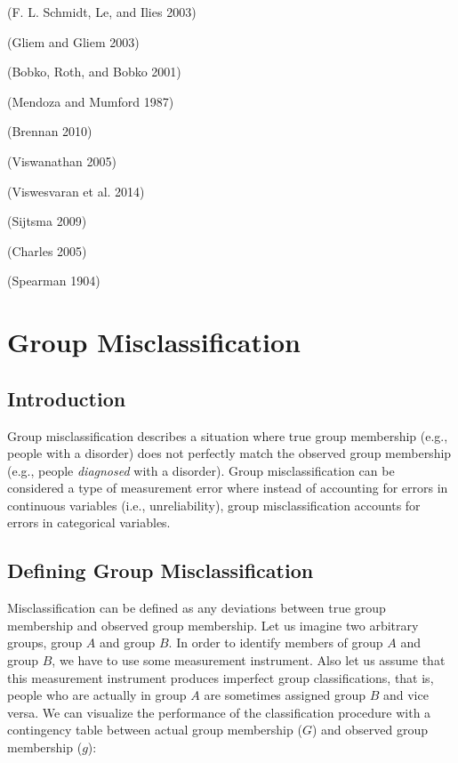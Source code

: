 \documentclass[
  letterpaper,
  DIV=11,
  numbers=noendperiod]{scrreprt}
\begin{document}
(F. L. Schmidt, Le, and Ilies 2003)

(Gliem and Gliem 2003)

(Bobko, Roth, and Bobko 2001)

(Mendoza and Mumford 1987)

(Brennan 2010)

(Viswanathan 2005)

(Viswesvaran et al. 2014)

(Sijtsma 2009)

(Charles 2005)

(Spearman 1904)

\hypertarget{group-misclassification}{%
\chapter{Group Misclassification}\label{group-misclassification}}

\hypertarget{introduction-2}{%
\section{Introduction}\label{introduction-2}}

Group misclassification describes a situation where true group
membership (e.g., people with a disorder) does not perfectly match the
observed group membership (e.g., people \emph{diagnosed} with a
disorder). Group misclassification can be considered a type of
measurement error where instead of accounting for errors in continuous
variables (i.e., unreliability), group misclassification accounts for
errors in categorical variables.

\hypertarget{defining-group-misclassification}{%
\section{Defining Group
Misclassification}\label{defining-group-misclassification}}

Misclassification can be defined as any deviations between true group
membership and observed group membership. Let us imagine two arbitrary
groups, group \(A\) and group \(B\). In order to identify members of
group \(A\) and group \(B\), we have to use some measurement instrument.
Also let us assume that this measurement instrument produces imperfect
group classifications, that is, people who are actually in group \(A\)
are sometimes assigned group \(B\) and vice versa. We can visualize the
performance of the classification procedure with a contingency table
between actual group membership (\(G\)) and observed group membership
(\(g\)):
\end{document}
